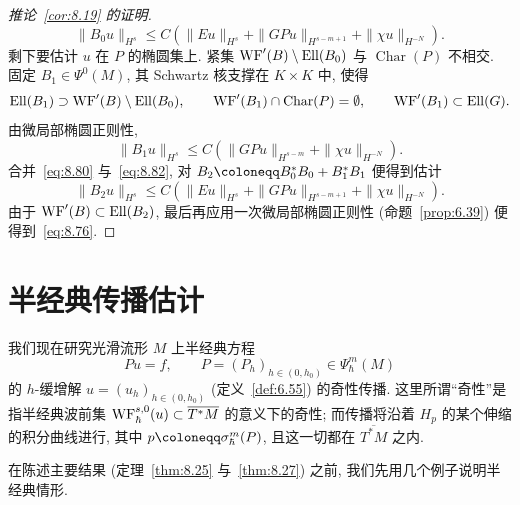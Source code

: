 \begin{proof}[推论~\ref{cor:8.19} 的证明]
\begin{equation}\label{eq:8.80}
    \| B_0 u \|_{H^s} \le C\left( \| E u \|_{H^s} + \| G P u \|_{H^{s-m+1}} + \| \chi u \|_{H^{-N}} \right).
\end{equation}
剩下要估计 $u$ 在 $P$ 的椭圆集上. 紧集 $\operatorname{WF}'(B) \setminus \operatorname{Ell}(B_0)$ 与 $\operatorname{Char}(P)$ 不相交. 固定 $B_1 \in \Psi^0(M)$, 其 Schwartz 核支撑在 $K \times K$ 中, 使得
\begin{equation}\label{eq:8.81}
    \operatorname{Ell}(B_1) \supset \operatorname{WF}'(B) \setminus \operatorname{Ell}(B_0), \qquad \operatorname{WF}'(B_1) \cap \operatorname{Char}(P) = \emptyset, \qquad \operatorname{WF}'(B_1) \subset \operatorname{Ell}(G).
\end{equation}
由微局部椭圆正则性,
\begin{equation}\label{eq:8.82}
    \| B_1 u \|_{H^s} \le C\left( \| G P u \|_{H^{s-m}} + \| \chi u \|_{H^{-N}} \right).
\end{equation}
合并~\eqref{eq:8.80} 与~\eqref{eq:8.82}, 对 $B_2 \defeq B_0^* B_0 + B_1^* B_1$ 便得到估计
\begin{equation}\label{eq:8.83}
    \| B_2 u \|_{H^s} \le C\left( \| E u \|_{H^s} + \| G P u \|_{H^{s-m+1}} + \| \chi u \|_{H^{-N}} \right).
\end{equation}
由于 $\operatorname{WF}'(B) \subset \operatorname{Ell}(B_2)$, 最后再应用一次微局部椭圆正则性 (命题~\ref{prop:6.39}) 便得到~\eqref{eq:8.76}.
\end{proof}



\section{半经典传播估计}\label{sec:8.7}

我们现在研究光滑流形 $M$ 上半经典方程
\begin{equation}\label{eq:8.84}
    P u = f, \qquad P = (P_h)_{h \in (0, h_0)} \in \Psi_\hbar^m(M)
\end{equation}
的 $h$-缓增解 $u = (u_h)_{h \in (0, h_0)}$ (定义~\ref{def:6.55}) 的奇性传播. 这里所谓``奇性''是指半经典波前集 $\operatorname{WF}_\hbar^{s,0}(u) \subset \overline{T^*M}$ 的意义下的奇性; 而传播将沿着 $H_p$ 的某个伸缩的积分曲线进行, 其中 $p \defeq \sigma_\hbar^m(P)$, 且这一切都在 $\overline{T^*M}$ 之内.

在陈述主要结果 (定理~\ref{thm:8.25} 与~\ref{thm:8.27}) 之前, 我们先用几个例子说明半经典情形.


